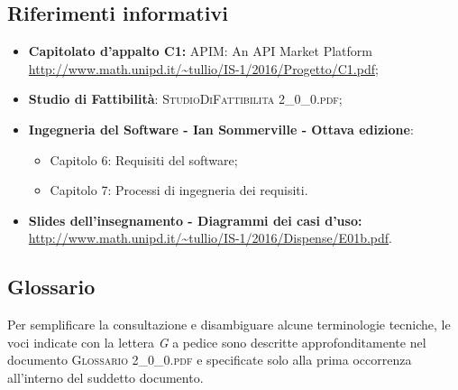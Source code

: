 \subsection{Riferimenti informativi}
\begin{itemize}
	\item \textbf{Capitolato d'appalto C1:} APIM: An API Market Platform\\ \url{http://www.math.unipd.it/~tullio/IS-1/2016/Progetto/C1.pdf};
	\item 	
	\textbf{Studio di Fattibilità}: \textsc{StudioDiFattibilita 2\_0\_0.pdf};
	\item
	\textbf{Ingegneria del Software - Ian Sommerville - Ottava edizione}:
	\begin{itemize}
		\item Capitolo 6: Requisiti del software;
		\item Capitolo 7: Processi di ingegneria dei requisiti.
	\end{itemize} 
	\item
	\textbf{Slides dell'insegnamento - Diagrammi dei casi d'uso:}\\ \url{http://www.math.unipd.it/~tullio/IS-1/2016/Dispense/E01b.pdf}.
\end{itemize}

\subsection{Glossario}
Per semplificare la consultazione e disambiguare alcune terminologie tecniche, le voci indicate con la lettera \textit{G} a pedice sono descritte approfonditamente nel documento \textsc{Glossario 2\_0\_0.pdf} e specificate solo alla prima occorrenza all'interno del suddetto documento.